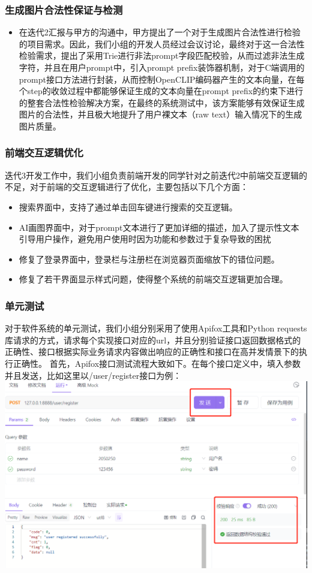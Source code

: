 \begin{frame}
    \frametitle{生成图片合法性保证与检测}
    \begin{itemize}
        \item 在迭代2汇报与甲方的沟通中，甲方提出了一个对于生成图片合法性进行检验的项目需求。因此，我们小组的开发人员经过会议讨论，最终对于这一合法性检验需求，提出了采用Trie进行非法prompt字段匹配校验，从而过滤非法生成字符，并且在用户prompt中，引入prompt prefix装饰器机制，对于C端调用的prompt接口方法进行封装，从而控制OpenCLIP编码器产生的文本向量，在每个step的收敛过程中都能够保证生成的文本向量在prompt prefix的约束下进行的整套合法性检验解决方案，在最终的系统测试中，该方案能够有效保证生成图片的合法性，并且极大地提升了用户裸文本（raw text）输入情况下的生成图片质量。
    \end{itemize}
\end{frame}

\begin{frame}
    \frametitle{前端交互逻辑优化}
    迭代3开发工作中，我们小组负责前端开发的同学针对之前迭代2中前端交互逻辑的不足，对于前端的交互逻辑进行了优化，主要包括以下几个方面：
    \begin{itemize}
        \item 搜索界面中，支持了通过单击回车键进行搜索的交互逻辑。
        \item AI画图界面中，对于prompt文本进行了更加详细的描述，加入了提示性文本引导用户操作，避免用户使用时因为功能和参数过于复杂导致的困扰
        \item 修复了登录界面中，登录栏与注册栏在浏览器页面缩放下的错位问题。
        \item 修复了若干界面显示样式问题，使得整个系统的前端交互逻辑更加合理。
    \end{itemize}
\end{frame}

\begin{frame}
    \frametitle{单元测试}
    对于软件系统的单元测试，我们小组分别采用了使用Apifox工具和Python requests库请求的方式，请求每个实现接口对应的url，并且分别验证接口返回数据格式的正确性、接口根据实际业务请求内容做出响应的正确性和接口在高并发情景下的执行正确性。
    首先，Apifox接口测试流程大致如下。在每个接口定义中，填入参数并且发送，比如这里以/user/register接口为例：
    \includegraphics[width=\textwidth]{contents/figure/user_register.png}
\end{frame}


